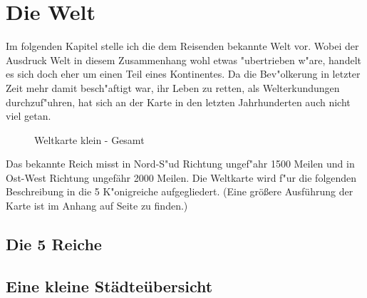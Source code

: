 \chapter{Die Welt}
\label{diewelt}
\par Im folgenden Kapitel stelle ich die dem Reisenden bekannte Welt vor.
Wobei der Ausdruck Welt in diesem Zusammenhang wohl etwas
"ubertrieben w"are, handelt es sich doch eher um einen Teil eines Kontinentes. Da
die Bev"olkerung in letzter Zeit mehr damit besch"aftigt war, ihr
Leben zu retten, als Welterkundungen durchzuf"uhren, hat sich an der
Karte in den letzten Jahrhunderten auch nicht viel getan.

\begin{figure}[hbtp]
\begin{center}
\end{center}
\caption{Weltkarte klein - Gesamt}
\label{worldmapsmall}
\end{figure}

\par Das bekannte Reich misst in Nord-S"ud Richtung ungef"ahr 1500
Meilen und in Ost-West Richtung ungefähr 2000 Meilen. Die Weltkarte wird f"ur die
folgenden Beschreibung in die 5 K"onigreiche aufgegliedert. (Eine größere Ausführung 
der Karte ist im Anhang auf Seite \pageref{worldmap} zu finden.)

\section{Die 5 Reiche}











\section{Eine kleine Städteübersicht}









